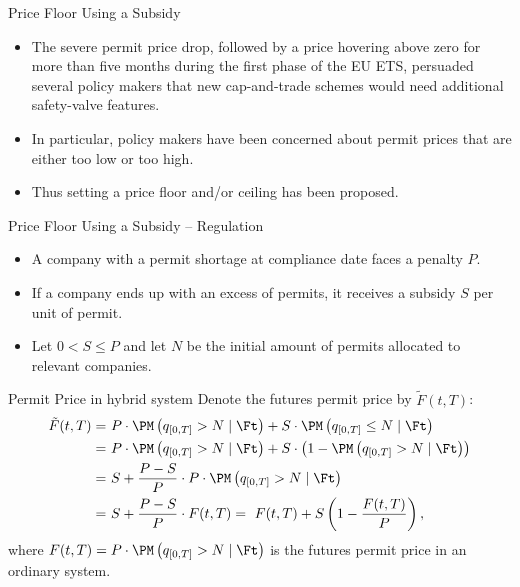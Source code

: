 



{Price Floor Using a Subsidy}
\begin{itemize}
\item<1-> The severe permit price drop, followed by a price hovering above zero for more than five months during the first phase of the EU ETS, persuaded several policy makers that new cap-and-trade schemes would need additional safety-valve features.
\item<2-> In particular, policy makers have been concerned about permit prices that are either too low or too high.
\item<3-> Thus setting a price floor and/or ceiling has been proposed.
\end{itemize}



{Price Floor Using a Subsidy -- Regulation}
\begin{itemize}
\item<1-> A company with a permit shortage at compliance date faces a penalty $P$.
\item<2-> If a company ends up with an excess of permits, it receives a subsidy $S$ per unit of permit.
\item<3-> Let $0<S\leq P$ and let $N$ be the initial amount of permits allocated to relevant companies.
\end{itemize}


{Permit Price in hybrid system}
Denote the futures permit price by $\tilde{F}(t,T)$:
\begin{align*}
\tilde{F}(t,T) =& \ P \cdot \PM \left( q_{[0,T]} > N \mid \Ft \right) + S \cdot \PM \left( q_{[0,T]} \le N \mid \Ft \right) \\
  =& \ P \cdot \PM \left( q_{[0,T]} > N \mid \Ft \right) + S \cdot \left( 1 - \PM \left( q_{[0,T]} > N \mid \Ft \right)\right) \\
  =& \ S + \frac{P-S}{P} \cdot P \cdot \PM \left( q_{[0,T]} > N \mid \Ft \right) \\
  =& \ S + \frac{P-S}{P} \cdot F(t,T) = \ F(t,T) + S\left(1 - \frac{F(t,T)}{P}\right),
\end{align*}
where $F(t,T) = P \cdot \PM \left( q_{[0,T]} > N \mid \Ft \right)$ is the futures permit price in an ordinary system.



